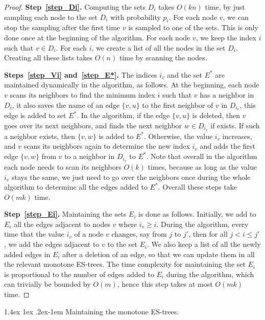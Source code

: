 \documentclass[11pt]{article}
\makeatletter
\theoremstyle{definition}
\theoremstyle{remark}
\renewcommand{\paragraph}{%
  \@startsection{paragraph}{4}%
  {\z@}{1.4ex \@plus 1ex \@minus .2ex}{-1em}%
  {\normalfont\normalsize\bfseries}%
}
\makeatother
\begin{document}
\begin{proof}
\textbf{Step~\ref{step_Di}.} Computing the sets $D_i$ takes $O(kn)$ time, by just sampling each node to the set $D_i$ with probability $p_i$. For each node $v$, we can stop the sampling after the first time $v$ is sampled to one of the sets. This is only done once at the beginning of the algorithm. For each node $v$, we keep the index $i$ such that $v \in D_i$. For each $i$, we create a list of all the nodes in the set $D_i$. Creating all these lists takes $O(n)$ time by scanning the nodes.

\textbf{Steps~\ref{step_Vi} and~\ref{step_E*}.} The indices $i_v$ and the set $E^*$ are maintained dynamically in the algorithm, as follows. At the beginning, each node $v$ scans its neighbors to find the minimum index $i$ such that $v$ has a neighbor in $D_i$, it also saves the name of an edge $\{v,u\}$ to the first neighbor of $v$ in $D_{i_v}$, this edge is added to set $E^*$. In the algorithm, if the edge $\{v,u\}$ is deleted, then $v$ goes over its next neighbors, and finds the next neighbor $w \in D_{i_v}$ if exists. If such a neighbor exists, then $\{v,w\}$ is added to $E^*$. Otherwise, the value $i_v$ increases, and $v$ scans its neighbors again to determine the new index $i_v$ and adds the first edge $\{v,w\}$ from $v$ to a neighbor in $D_{i_v}$ to $E^*$. Note that overall in the algorithm each node needs to scan its neighbors $O(k)$ times, because as long as the value $i_v$ stays the same, we just need to go over the neighbors once during the whole algorithm to determine all the edges added to $E^*$. Overall these steps take $O(mk)$ time. 

\textbf{Step~\ref{step_Ei}.} Maintaining the sets $E_i$ is done as follows. Initially, we add to $E_i$ all the edges adjacent to nodes $v$ where $i_v \geq i$. During the algorithm, every time that the value $i_v$ of a node $v$ changes, say from $j$ to $j'$, then for all $j < i \leq j'$, we add the edges adjacent to $v$ to the set $E_i$. We also keep a list of all the newly added edges in $E_i$ after a deletion of an edge, so that we can update them in all the relevant monotone ES-trees. The time complexity for maintaining the set $E_i$ is proportional to the number of edges added to $E_i$ during the algorithm, which can trivially be bounded by $O(m)$, hence this step takes at most $O(mk)$ time.  
\end{proof}

\paragraph{Maintaining the monotone ES-trees.} 
\end{document}
